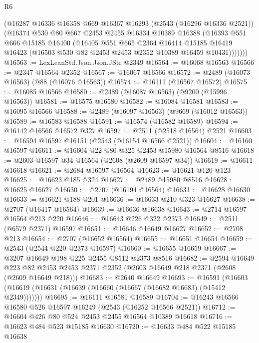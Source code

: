 \begin{lexlean}{R6}
\begin{coremodule}
        (@16287
          @16336
          @16358
          @669
          @16367
          @16293
          (@2543 (@16296 @16336 @2521))
          (@16374
            @530
            @80
            @667
            @2453
            @2455
            @16334
            @10389
            @16388
            (@16393
              @551
              @666
              @15185
              @16400
              (@16405
                @551
                @665
                @2364
                @16414
                @15185
                @16419
                @16423
                (@16503 @530 @82 @2453 @2453 @2352 @10389 @16459 @10431)))))))
@16563 := LexLeanStd.Json.Json.JStr @2349
@16564 := @16068 @16563
@16566 := @2347 @16564 @2352
@16567 := @16067 @16566
@16572 := @2489 (@16073 @16563) (@88 (@16076 @16563))
@16574 := @16111 (@16567 @16572)
@16575 := @16085 @16566
@16580 := @2489 (@16087 @16563) (@9200 (@15996 @16563))
@16581 := @16575 @16580
@16582 := @16084 @16581
@16583 := @16095 @16566
@16588 := @2489 (@16097 @16563) (@9669 (@16012 @16563))
@16589 := @16583 @16588
@16591 := @16574 (@16582 @16589)
@16594 := @16142 @16566 @16572 @327
@16597 := @2511 (@2518 @16564) @2521
@16603 := @16594 @16597 @16151 (@2543 (@16154 @16566 @2521))
@16604 := @16160 @16597
@16611 := @16604 @22 @80 @325 @2453 @15980 @16564 @8516
@16618 := @2603 @16597 @34 @16564 (@2608 (@2609 @16597 @34))
@16619 := @16611 @16618
@16621 := @2684 @16597 @16564
@16623 := @16621 @120 @123
@16625 := @16623 @185 @324
@16627 := @2489 @15980 @8516
@16628 := @16625 @16627
@16630 := @2707 (@16194 @16564)
@16631 := @16628 @16630
@16633 := @16621 @188 @201
@16636 := @16633 @210 @323 @16627
@16638 := @2707 (@16417 @16564)
@16639 := @16636 @16638
@16643 := @2714 @16597 @16564 @213 @220
@16646 := @16643 @226 @322 @2373
@16649 := @2511 (@6579 @2371) @16597
@16651 := @16646 @16649 @16627
@16652 := @2708 @213
@16654 := @2707 (@16652 @16564)
@16655 := @16651 @16654
@16659 := @2543 (@2544 @220 @2373 @16597)
@16660 := @16655 @16659
@16667 := @3207 @16649 @198 @225 @2455 @8512 @2373 @8516
@16682 := @2594
    @16649
    @223
    @82
    @2453
    @2453
    @2371
    @2352
    (@2603 @16649 @218 @2371 (@2608 (@2609 @16649 @218)))
@16683 := @2640 @16649
@16693 := @16591
    (@16603 (@16619 (@16631 (@16639 (@16660 (@16667 (@16682 @16683) (@15412 @2349)))))))
@16695 := @16111 @16581 @16589
@16704 := @16243 @16566 @16580 @526 @16597 @16249 (@2543 (@16252 @16566 @2521))
@16712 := @16604 @426 @80 @524 @2453 @2455 @16564 @10389 @16618
@16716 := @16623 @484 @523 @15185 @16630
@16720 := @16633 @484 @522 @15185 @16638

\end{coremodule}
\end{lexlean}
